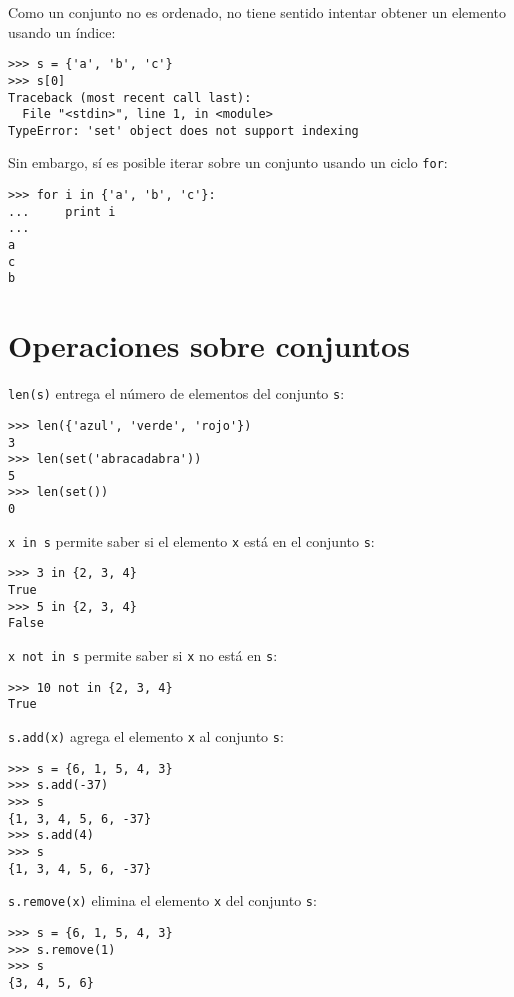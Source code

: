 Como un conjunto no es ordenado, no tiene sentido intentar obtener un
elemento usando un índice:

\begin{lstlisting}
>>> s = {'a', 'b', 'c'}
>>> s[0]
Traceback (most recent call last):
  File "<stdin>", line 1, in <module>
TypeError: 'set' object does not support indexing
\end{lstlisting}

Sin embargo, sí es posible iterar sobre un conjunto usando un ciclo
\lstinline!for!:

\begin{lstlisting}
>>> for i in {'a', 'b', 'c'}:
...     print i
...
a
c
b
\end{lstlisting}

\section{Operaciones sobre conjuntos}

\lstinline!len(s)! entrega el número de elementos del conjunto
\lstinline!s!:

\begin{lstlisting}
>>> len({'azul', 'verde', 'rojo'})
3
>>> len(set('abracadabra'))
5
>>> len(set())
0
\end{lstlisting}

\lstinline!x in s! permite saber si el elemento \lstinline!x! está en el
conjunto \lstinline!s!:

\begin{lstlisting}
>>> 3 in {2, 3, 4}
True
>>> 5 in {2, 3, 4}
False
\end{lstlisting}

\lstinline!x not in s! permite saber si \lstinline!x! no está en
\lstinline!s!:

\begin{lstlisting}
>>> 10 not in {2, 3, 4}
True
\end{lstlisting}

\lstinline!s.add(x)! agrega el elemento \lstinline!x! al conjunto
\lstinline!s!:

\begin{lstlisting}
>>> s = {6, 1, 5, 4, 3}
>>> s.add(-37)
>>> s
{1, 3, 4, 5, 6, -37}
>>> s.add(4)
>>> s
{1, 3, 4, 5, 6, -37}
\end{lstlisting}

\lstinline!s.remove(x)! elimina el elemento \lstinline!x! del conjunto
\lstinline!s!:

\begin{lstlisting}
>>> s = {6, 1, 5, 4, 3}
>>> s.remove(1)
>>> s
{3, 4, 5, 6}
\end{lstlisting}

